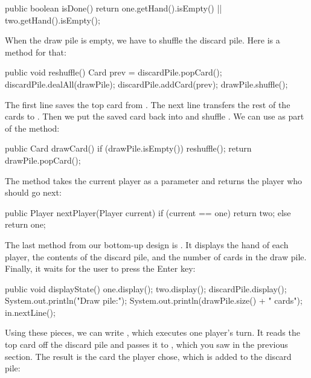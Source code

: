 \begin{code}
public boolean isDone() {
    return one.getHand().isEmpty() || two.getHand().isEmpty();
}
\end{code}

When the draw pile is empty, we have to shuffle the discard pile.
Here is a method for that:

\begin{code}
public void reshuffle() {
    Card prev = discardPile.popCard();
    discardPile.dealAll(drawPile);
    discardPile.addCard(prev);
    drawPile.shuffle();
}
\end{code}

The first line saves the top card from .
The next line transfers the rest of the cards to .
Then we put the saved card back into  and shuffle .
We can use  as part of the  method:

\begin{code}
public Card drawCard() {
    if (drawPile.isEmpty()) {
        reshuffle();
    }
    return drawPile.popCard();
}
\end{code}

The  method takes the current player as a parameter and returns the player who should go next:

\begin{code}
public Player nextPlayer(Player current) {
    if (current == one) {
        return two;
    } else {
        return one;
    }
}
\end{code}

The last method from our bottom-up design is .
It displays the hand of each player, the contents of the discard pile, and the number of cards in the draw pile.
Finally, it waits for the user to press the {\sf Enter} key:


\begin{code}
public void displayState() {
    one.display();
    two.display();
    discardPile.display();
    System.out.println("Draw pile:");
    System.out.println(drawPile.size() + " cards");
    in.nextLine();
}
\end{code}

Using these pieces, we can write , which executes one player's turn.
It reads the top card off the discard pile and passes it to , which you saw in the previous section.
The result is the card the player chose, which is added to the discard pile:

